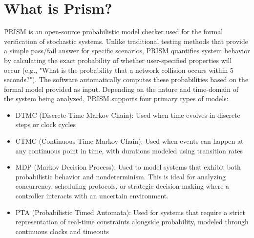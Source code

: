 	\section*{What is Prism?}
PRISM is an open-source probabilistic model checker used for the formal verification of stochastic systems.
Unlike traditional testing methods that provide a simple pass/fail answer for specific scenarios, PRISM quantifies system behavior by calculating
the exact probability of whether user-specified properties will occur (e.g., "What is the probability that a network collision occurs within 5 seconds?").
The software automatically computes these probabilities based on the formal model provided as input.
Depending on the nature and time-domain of the system being analyzed, PRISM supports four primary types of models:
  \begin{itemize}
    \item DTMC (Discrete-Time Markov Chain): Used when time evolves in discrete steps or clock cycles
    \item CTMC (Continuous-Time Markov Chain): Used when events can happen at any continuous point in time, with durations modeled using transition rates
    \item MDP (Markov Decision Process): Used to model systems that exhibit both probabilistic behavior and nondeterminism.
      This is ideal for analyzing concurrency, scheduling protocols, or strategic decision-making where a controller interacts with an uncertain environment.
    \item PTA (Probabilistic Timed Automata): Used for systems that require a strict representation of real-time constraints alongside probability, modeled through continuous clocks and timeouts
  \end{itemize}
  
